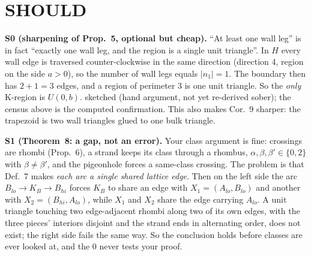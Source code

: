 \documentclass[11pt]{amsart}
\newcommand{\gr}[1]{\textsf{#1}}
\theoremstyle{definition}
\begin{document}
\section{SHOULD}

\noindent\textbf{S0 (sharpening of Prop.~5, optional but cheap).} ``At least one wall leg'' is in fact ``exactly one wall leg, and the region is a single unit triangle''. In $H$ every wall edge is traversed counter-clockwise in the same direction (direction 4, region on the side $a>0$), so the number of wall legs equals $|n_1|=1$. The boundary then has $2+1=3$ edges, and a region of perimeter 3 is one unit triangle. So the \emph{only} K-region is $U(0,b)$. \gr{sketched} (hand argument, not yet re-derived sober); the census above is the \gr{computed} confirmation. This also makes Cor.~9 sharper: the trapezoid is two wall triangles glued to one bulk triangle.

\medskip
\noindent\textbf{S1 (Theorem~8: a gap, not an error).} Your class argument is fine: crossings are rhombi (Prop.~6), a strand keeps its class through a rhombus, $\alpha,\beta,\beta'\in\{0,2\}$ with $\beta\ne\beta'$, and the pigeonhole forces a same-class crossing. The problem is that Def.~7 makes \emph{each arc a single shared lattice edge}. Then on the left side the arc $B_{lo}\to K_B\to B_{hi}$ forces $K_B$ to share an edge with $X_1=(A_{lo},B_{lo})$ and another with $X_2=(B_{hi},A_{lo})$, while $X_1$ and $X_2$ share the edge carrying $A_{lo}$. A unit triangle touching two edge-adjacent rhombi along two of its own edges, with the three pieces' interiors disjoint and the strand ends in alternating order, does not exist; the right side fails the same way. So the conclusion holds before classes are ever looked at, and the 0 never tests your proof.
\end{document}
